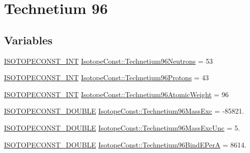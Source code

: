 \hypertarget{group___isotope_const-_technetium-_tc96}{}\section{Technetium 96}
\label{group___isotope_const-_technetium-_tc96}
\subsection*{Variables}
\begin{DoxyCompactItemize}
\item 
\mbox{\hyperlink{group___isotope_const-_macros_ga5f18360b3e99483a35c32d789e62621c}{I\+S\+O\+T\+O\+P\+E\+C\+O\+N\+S\+T\+\_\+\+I\+NT}} \mbox{\hyperlink{group___isotope_const-_technetium-_tc96_gadc1b93929ae1f595a6824f180e28d2cc}{Isotope\+Const\+::\+Technetium96\+Neutrons}} = 53
\item 
\mbox{\hyperlink{group___isotope_const-_macros_ga5f18360b3e99483a35c32d789e62621c}{I\+S\+O\+T\+O\+P\+E\+C\+O\+N\+S\+T\+\_\+\+I\+NT}} \mbox{\hyperlink{group___isotope_const-_technetium-_tc96_gad43ef72999175f84457dc03a4c30cd80}{Isotope\+Const\+::\+Technetium96\+Protons}} = 43
\item 
\mbox{\hyperlink{group___isotope_const-_macros_ga5f18360b3e99483a35c32d789e62621c}{I\+S\+O\+T\+O\+P\+E\+C\+O\+N\+S\+T\+\_\+\+I\+NT}} \mbox{\hyperlink{group___isotope_const-_technetium-_tc96_gaefa9008619b858346514797ad242887a}{Isotope\+Const\+::\+Technetium96\+Atomic\+Weight}} = 96
\item 
\mbox{\hyperlink{group___isotope_const-_macros_ga8f45a7272ce02c0b4c65c44636ed719a}{I\+S\+O\+T\+O\+P\+E\+C\+O\+N\+S\+T\+\_\+\+D\+O\+U\+B\+LE}} \mbox{\hyperlink{group___isotope_const-_technetium-_tc96_gacb282d17bfe53c77fb6c71f65e4ed744}{Isotope\+Const\+::\+Technetium96\+Mass\+Exc}} = -\/85821.
\item 
\mbox{\hyperlink{group___isotope_const-_macros_ga8f45a7272ce02c0b4c65c44636ed719a}{I\+S\+O\+T\+O\+P\+E\+C\+O\+N\+S\+T\+\_\+\+D\+O\+U\+B\+LE}} \mbox{\hyperlink{group___isotope_const-_technetium-_tc96_ga4355c037628f3b7fd809d184e5000126}{Isotope\+Const\+::\+Technetium96\+Mass\+Exc\+Unc}} = 5.
\item 
\mbox{\hyperlink{group___isotope_const-_macros_ga8f45a7272ce02c0b4c65c44636ed719a}{I\+S\+O\+T\+O\+P\+E\+C\+O\+N\+S\+T\+\_\+\+D\+O\+U\+B\+LE}} \mbox{\hyperlink{group___isotope_const-_technetium-_tc96_gaf12f2d68f3409809c84a26f053f31cf2}{Isotope\+Const\+::\+Technetium96\+Bind\+E\+PerA}} = 8614.
\item 

\end{DoxyCompactItemize}
